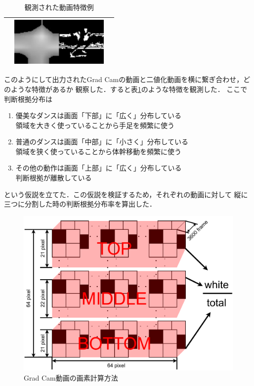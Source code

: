 \begin{table}[t]
\begin{center}
\begin{tabular}{|c|c|c|}
        & \includegraphics[width=48mm]{images/cam/running.png}
      \\ \hline
    \end{tabular}
  \end{center}
  \caption{観測された動画特徴例}
  \label{examples}
\end{table}

このようにして出力されたGrad Camの動画と二値化動画を横に繋ぎ合わせ，どのような特徴があるか
観察した．すると表\ref{examples}のような特徴を観測した．
ここで判断根拠分布は
\begin{enumerate}
  \item 優美なダンスは画面「下部」に「広く」分布している \\
        領域を大きく使っていることから手足を頻繁に使う
  \item 普通のダンスは画面「中部」に「小さく」分布している \\
        領域を狭く使っていることから体幹移動を頻繁に使う
  \item その他の動作は画面「上部」に「広く」分布している \\
        判断根拠が離散している
\end{enumerate}
という仮説を立てた．この仮説を検証するため，それぞれの動画に対して
縦に三つに分割した時の判断根拠分布率を算出した．
\clearpage

\begin{figure}[t]
  \begin{center}
    \includegraphics[width=120mm]{images/chart/divide.pdf}
  \end{center}
  \caption{Grad Cam動画の画素計算方法}
  \label{divide_graph}
\end{figure}

